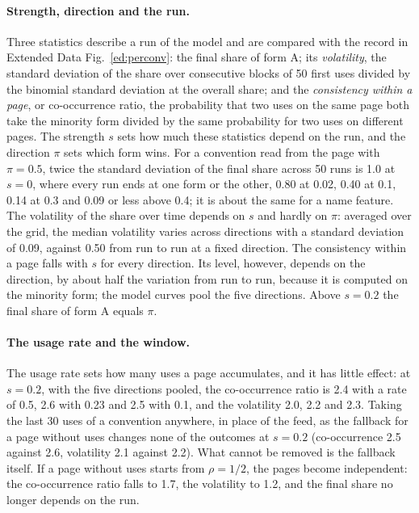 \documentclass[10pt]{article}
\begin{document}
\paragraph{Strength, direction and the run.} Three statistics describe a run of the model and are compared with the record in Extended Data Fig.~\ref{ed:perconv}: the final share of form A; its \emph{volatility}, the standard deviation of the share over consecutive blocks of 50 first uses divided by the binomial standard deviation at the overall share; and the \emph{consistency within a page}, or co-occurrence ratio, the probability that two uses on the same page both take the minority form divided by the same probability for two uses on different pages. The strength $s$ sets how much these statistics depend on the run, and the direction $\pi$ sets which form wins. For a convention read from the page with $\pi=0.5$, twice the standard deviation of the final share across 50 runs is 1.0 at $s=0$, where every run ends at one form or the other, 0.80 at 0.02, 0.40 at 0.1, 0.14 at 0.3 and 0.09 or less above 0.4; it is about the same for a name feature. The volatility of the share over time depends on $s$ and hardly on $\pi$: averaged over the grid, the median volatility varies across directions with a standard deviation of 0.09, against 0.50 from run to run at a fixed direction. The consistency within a page falls with $s$ for every direction. Its level, however, depends on the direction, by about half the variation from run to run, because it is computed on the minority form; the model curves pool the five directions. Above $s=0.2$ the final share of form A equals $\pi$.

\paragraph{The usage rate and the window.} The usage rate sets how many uses a page accumulates, and it has little effect: at $s=0.2$, with the five directions pooled, the co-occurrence ratio is 2.4 with a rate of 0.5, 2.6 with 0.23 and 2.5 with 0.1, and the volatility 2.0, 2.2 and 2.3. Taking the last 30 uses of a convention anywhere, in place of the feed, as the fallback for a page without uses changes none of the outcomes at $s=0.2$ (co-occurrence 2.5 against 2.6, volatility 2.1 against 2.2). What cannot be removed is the fallback itself. If a page without uses starts from $\rho=1/2$, the pages become independent: the co-occurrence ratio falls to 1.7, the volatility to 1.2, and the final share no longer depends on the run.
\end{document}
